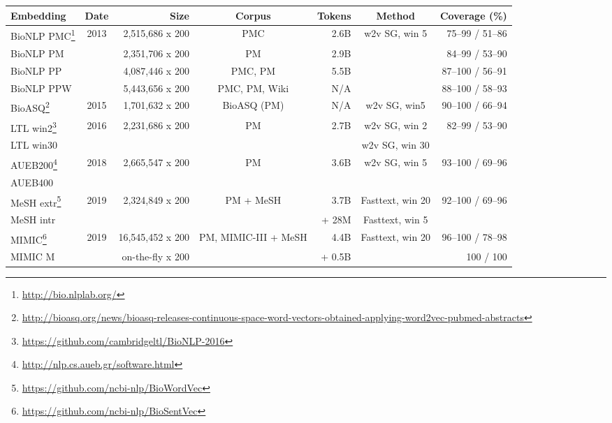 \documentclass[letterpaper]{article} %
\begin{document}
\begin{table}[h]
    \centering
    \small
    \begin{tabular}{l c r c r c r}
    \toprule
         Embedding & Date & Size & Corpus & Tokens & Method & Coverage (\%) \\
         \midrule
         BioNLP PMC\footnote{\url{http://bio.nlplab.org/}} & \multirow{4}{*}{2013} & 2,515,686 x 200 & PMC & 2.6B & 
         \multirow{4}{*}{w2v SG, win 5} & 75--99 /  51--86\\
         BioNLP PM & & 2,351,706 x 200 & PM & 2.9B & & 84--99 / 53--90\\ 
         BioNLP PP & & 4,087,446 x 200 & PMC, PM & 5.5B & & 87--100 / 56--91\\ 
         BioNLP PPW & & 5,443,656 x 200 & PMC, PM, Wiki & N/A & & 88--100 / 58--93\\ \midrule[.01em]
         BioASQ\footnote{ \url{http://bioasq.org/news/bioasq-releases-continuous-space-word-vectors-obtained-applying-word2vec-pubmed-abstracts}} & 2015 & 1,701,632 x 200 & BioASQ (PM) & N/A & w2v SG, win5 & 90--100 / 66--94 \\ \midrule[.01em]
         LTL win2\footnote{\url{https://github.com/cambridgeltl/BioNLP-2016}} &  \multirow{2}{*}{2016} & \multirow{2}{*}{2,231,686 x 200} &  \multirow{2}{*}{PM} &  \multirow{2}{*}{2.7B}
         & w2v SG, win 2 & \multirow{2}{*}{82--99 / 53--90} \\
         LTL win30 & & & & & w2v SG, win 30 \\ \midrule[.01em]
         AUEB200\footnote{\url{http://nlp.cs.aueb.gr/software.html}} & \multirow{2}{*}{2018} & \multirow{2}{*}{2,665,547 x 200} &\multirow{2}{*}{PM} &  \multirow{2}{*}{3.6B}
         & \multirow{2}{*}{w2v SG, win 5} & \multirow{2}{*}{93--100 / 69--96}\\
         AUEB400  \\ \midrule[.01em]
         MeSH extr\footnote{\url{https://github.com/ncbi-nlp/BioWordVec}} & \multirow{2}{*}{2019} & \multirow{2}{*}{2,324,849 x 200} & \multirow{2}{*}{PM + MeSH} & 3.7B
         & Fasttext, win 20 & \multirow{2}{*}{92--100 / 69--96}\\
         MeSH intr & & & & + 28M
         & Fasttext, win 5 \\
         MIMIC\footnote{\url{https://github.com/ncbi-nlp/BioSentVec}} & \multirow{2}{*}{2019} & 16,545,452 x 200 & \multirow{2}{*}{PM, MIMIC-III + MeSH} & 4.4B
         & \multirow{2}{*}{Fasttext, win 20} & 96--100 / 78--98\\
         MIMIC M & & on-the-fly x 200 & & + 0.5B & & 100 / 100\\

\end{tabular}
\end{table}
\end{document}
